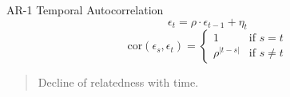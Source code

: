 \documentclass{beamer}
\begin{document}
\begin{frame}{AR-1 Temporal Autocorrelation}
  \[
  \epsilon_t = \rho \cdot \epsilon_{t-1} + \eta_t
  \]
  \[
  \text{cor}(\epsilon_s, \epsilon_t) = 
  \begin{cases}
    1 & \text{if } s = t \\
    \rho^{\vert t-s \vert} & \text{if } s \neq t
  \end{cases}
  \]
  \vspace{1cm}

  \begin{quote}
    \centering
    Decline of relatedness with time.
  \end{quote}
\end{frame}

\end{document}
